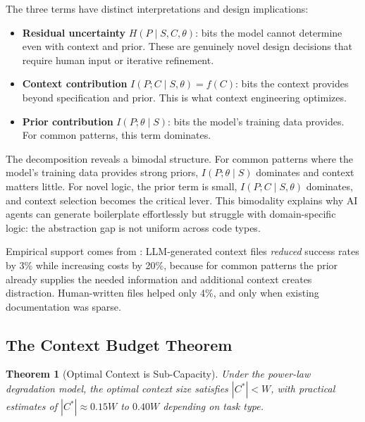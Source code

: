 \documentclass[11pt, a4paper, logo, copyright]{googledeepmind}
\newtheorem{theorem}{Theorem}[section]
\begin{document}
The three terms have distinct interpretations and design implications:

\begin{itemize}[nosep]
    \item \textbf{Residual uncertainty} $H(P \mid S, C, \theta)$: bits the model cannot determine even with context and prior. These are genuinely novel design decisions that require human input or iterative refinement.
    \item \textbf{Context contribution} $I(P; C \mid S, \theta) = f(C)$: bits the context provides beyond specification and prior. This is what context engineering optimizes.
    \item \textbf{Prior contribution} $I(P; \theta \mid S)$: bits the model's training data provides. For common patterns, this term dominates.
\end{itemize}

The decomposition reveals a bimodal structure. For common patterns where the model's training data provides strong priors, $I(P; \theta \mid S)$ dominates and context matters little. For novel logic, the prior term is small, $I(P; C \mid S, \theta)$ dominates, and context selection becomes the critical lever. This bimodality explains why AI agents can generate boilerplate effortlessly but struggle with domain-specific logic: the abstraction gap is not uniform across code types.

Empirical support comes from \citet{gloaguen2026agents}: LLM-generated context files \emph{reduced} success rates by 3\% while increasing costs by 20\%, because for common patterns the prior already supplies the needed information and additional context creates distraction. Human-written files helped only 4\%, and only when existing documentation was sparse.

\subsection{The Context Budget Theorem}

\begin{theorem}[Optimal Context is Sub-Capacity]
\label{thm:context-budget}
Under the power-law degradation model, the optimal context size satisfies $|C^*| < W$, with practical estimates of $|C^*| \approx 0.15W$ to $0.40W$ depending on task type.
\end{theorem}
\end{document}
